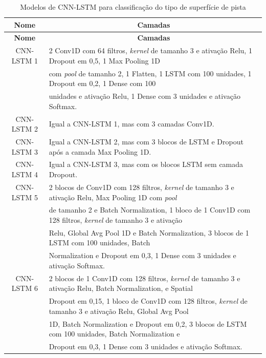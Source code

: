 \begin{center}
\scriptsize
\begin{longtable}{cl}
\caption{Modelos de CNN-LSTM para classificação do tipo de superfície de pista} 
\label{table:cnn_lstm_superficie_pista_1} \\
\toprule \textbf{Nome} & \multicolumn{1}{c}{\textbf{Camadas}} \\ \midrule
\endfirsthead
\toprule \textbf{Nome} & \multicolumn{1}{c}{\textbf{Camadas}} \\ \midrule
\endhead \endfoot \endlastfoot
CNN-LSTM 1 &  2 Conv1D com 64 filtros, \textit{kernel} de tamanho 3 e ativação Relu, 1 Dropout em 0,5, 1 Max Pooling 1D \\ & com \textit{pool} de tamanho 2, 1 Flatten, 1 LSTM com 100 unidades, 1 Dropout em 0,2, 1 Dense com 100 \\ & unidades e ativação Relu, 1 Dense com 3 unidades e ativação Softmax. \\ \midrule
CNN-LSTM 2 & Igual a CNN-LSTM 1, mas com 3 camadas Conv1D. \\ \midrule
CNN-LSTM 3 & Igual a CNN-LSTM 2, mas com 3 blocos de LSTM e Dropout após a camada Max Pooling 1D. \\ \midrule
CNN-LSTM 4 & Igual a CNN-LSTM 3, mas com os blocos LSTM sem camada Dropout. \\ \midrule
CNN-LSTM 5 &  2 blocos de Conv1D com 128 filtros, \textit{kernel} de tamanho 3 e ativação Relu, Max Pooling 1D com \textit{pool} \\ & de tamanho 2 e Batch Normalization, 1 bloco de 1 Conv1D com 128 filtros, \textit{kernel} de tamanho 3 e ativação \\ & Relu,  Global Avg Pool 1D e Batch Normalization, 3 blocos de 1 LSTM com 100 unidades, Batch \\ & Normalization e Dropout em 0,3, 1 Dense com 3 unidades e ativação Softmax. \\ \midrule
CNN-LSTM 6 & 2 blocos de 1 Conv1D com 128 filtros, \textit{kernel} de tamanho 3 e ativação Relu, Batch Normalization, e Spatial \\ &  Dropout em 0,15, 1 bloco de Conv1D com 128 filtros, \textit{kernel} de tamanho 3 e ativação Relu, Global Avg Pool \\& 1D, Batch Normalization e Dropout em 0,2, 3 blocos de LSTM com 100 unidades, Batch Normalization e \\ & Dropout em 0,3, 1 Dense com 3 unidades e ativação Softmax. \\ \bottomrule
\end{longtable}
\end{center}

